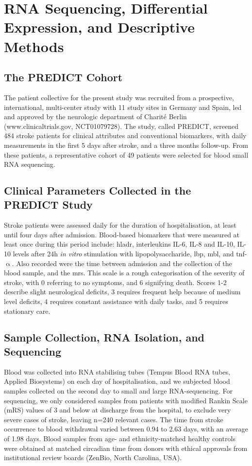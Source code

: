 \section{RNA Sequencing, Differential Expression, and Descriptive Methods}

\begin{method}

\subsection{The PREDICT Cohort}
The patient collective for the present study was recruited from a prospective, international, multi-center study with 11 study sites in Germany and Spain, led and approved by the neurologic department of Charité Berlin (www.clinicaltrials.gov, NCT01079728).\cite{Hoffmann2017} The study, called PREDICT, screened 484 stroke patients for clinical attributes and conventional biomarkers, with daily measurements in the first 5 days after stroke, and a three months follow-up. From these patients, a representative cohort of 49 patients were selected for blood small RNA sequencing. 

\subsection{Clinical Parameters Collected in the PREDICT Study}
Stroke patients were assessed daily for the duration of hospitalisation, at least until four days after admission. Blood-based biomarkers that were measured at least once during this period include: \ac{hladr}, interleukins IL-6, IL-8 and IL-10, IL-10 levels after 24h \emph{in vitro} stimulation with lipopolysaccharide, \ac{lbp}, \ac{mbl}, and \ac{tnf}-$\upalpha$. Also recorded were the time between admission and the collection of the blood sample, and the \ac{mrs}. This scale is a rough categorisation of the severity of stroke, with 0 referring to no symptoms, and 6 signifying death. Scores 1-2 describe slight neurological deficits, 3 requires frequent help because of medium level deficits, 4 requires constant assistance with daily tasks, and 5 requires stationary care.

\subsection{Sample Collection, RNA Isolation, and Sequencing}
Blood was collected into RNA stabilising tubes (Tempus Blood RNA tubes, Applied Biosystems) on each day of hospitalisation, and we subjected blood samples collected on the second day to small and large RNA-sequencing. For sequencing, we only considered samples from patients with modified Rankin Scale (mRS) values of 3 and below at discharge from the hospital, to exclude very severe cases of stroke, leaving n=240 relevant cases. The time from stroke occurrence to blood withdrawal varied between 0.94 to 2.63 days, with an average of 1.98 days. Blood samples from age- and ethnicity-matched healthy controls were obtained at matched circadian time from donors with ethical approvals from institutional review boards (ZenBio, North Carolina, USA).


\end{method}
